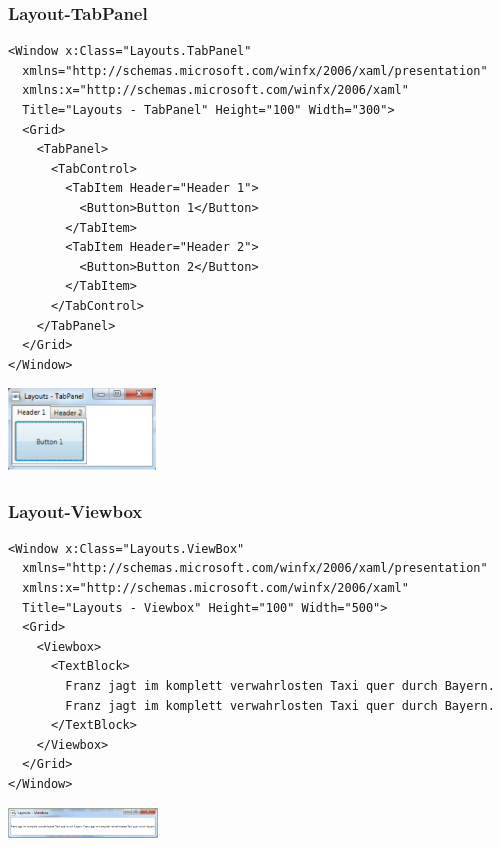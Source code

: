 \subsubsection{Layout-TabPanel}
\begin{minipage}{14cm}
\begin{lstlisting}[style=CSharp]
<Window x:Class="Layouts.TabPanel"
  xmlns="http://schemas.microsoft.com/winfx/2006/xaml/presentation"
  xmlns:x="http://schemas.microsoft.com/winfx/2006/xaml"
  Title="Layouts - TabPanel" Height="100" Width="300">
  <Grid>
    <TabPanel>
      <TabControl>
        <TabItem Header="Header 1">
          <Button>Button 1</Button>
        </TabItem>
        <TabItem Header="Header 2">
          <Button>Button 2</Button>
        </TabItem>
      </TabControl>
    </TabPanel>
  </Grid>
</Window>
\end{lstlisting}
\end{minipage}
\begin{minipage}{4cm}
  \includegraphics[width=4cm]{images/XAML/TabPanel}
\end{minipage}

\subsubsection{Layout-Viewbox}
\begin{minipage}{14cm}
\begin{lstlisting}[style=CSharp]
<Window x:Class="Layouts.ViewBox"
  xmlns="http://schemas.microsoft.com/winfx/2006/xaml/presentation"
  xmlns:x="http://schemas.microsoft.com/winfx/2006/xaml"
  Title="Layouts - Viewbox" Height="100" Width="500">
  <Grid>
    <Viewbox>
      <TextBlock>
        Franz jagt im komplett verwahrlosten Taxi quer durch Bayern.
        Franz jagt im komplett verwahrlosten Taxi quer durch Bayern.
      </TextBlock>
    </Viewbox>
  </Grid>
</Window>
\end{lstlisting}
\end{minipage}
\begin{minipage}{4cm}
  \includegraphics[width=4cm]{images/XAML/Viewbox}
\end{minipage}

